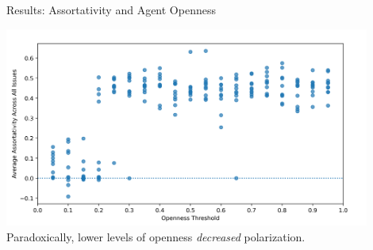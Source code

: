 \documentclass[12pt]{beamer}
\begin{document}
\begin{frame}[c]{Results: Assortativity and Agent Openness}  %

% 



\begin{center}
\includegraphics[width=0.9\textwidth]{images/AssortOpenness.png}
\small
Paradoxically, lower levels of openness \textit{decreased} polarization.
\end{center}

\end{frame}
\end{document}
